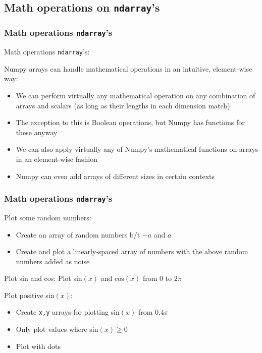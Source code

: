 \documentclass{beamer}
\newcommand{\code}[1]{\texttt{#1}}
\begin{document}
\subsection{Math operations on \code{ndarray}'s}

\begin{frame}	
	\frametitle{Math operations \code{ndarray}'s}
	
	\begin{block}{Math operations \code{ndarray}'s:}
		
		Numpy arrays can handle mathematical operations in an intuitive, element-wise way:
		\begin{itemize}
			\item We can perform virtually any mathematical operation on any combination of arrays and scalars (as long as their lengths in each dimension match)
			\item The exception to this is Boolean operations, but Numpy has functions for these anyway
			\item We can also apply virtually any of Numpy's mathematical functions on arrays in an element-wise fashion
			\item Numpy can even add arrays of different sizes in certain contexts
		\end{itemize}
	\end{block}
	
\end{frame}

\begin{frame}	
	\frametitle{Math operations \code{ndarray}'s}
	
	\begin{exampleblock}{Plot some random numbers:}
		\begin{itemize}
			\item Create an array of random numbers b/t $-a$ and $a$
			\item Create and plot a linearly-spaced array of numbers with the above random numbers added as noise
		\end{itemize}
	\end{exampleblock}
	
	\begin{exampleblock}{Plot sin and cos:}
		Plot sin$(x)$ and cos$(x)$ from 0 to $2\pi$
	\end{exampleblock}
	
	\begin{exampleblock}{Plot positive sin$(x)$:}
		\begin{itemize}
			\footnotesize
			\item Create \code{x,y} arrays for plotting sin$(x)$ from 0,$4\pi$
			\item Only plot values where sin$(x)\ge0$
			\item Plot with dots
		\end{itemize}
	\end{exampleblock}
	
\end{frame}
\end{document}
